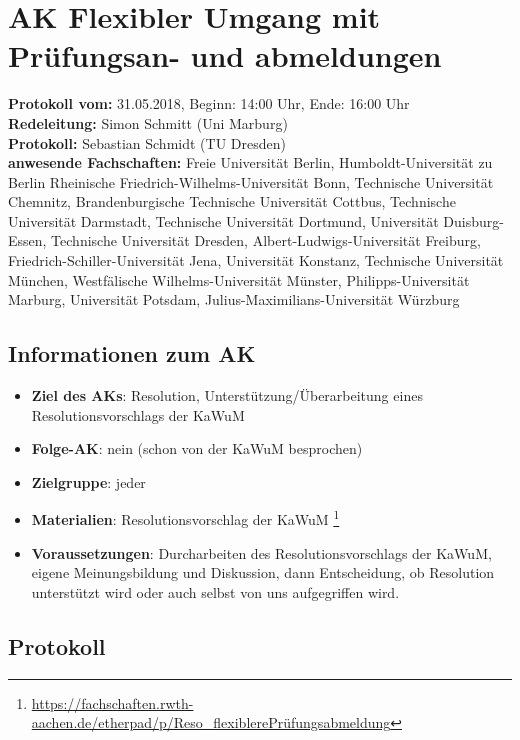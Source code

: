 
\section{AK Flexibler Umgang mit Prüfungsan- und abmeldungen}

  \textbf{Protokoll vom:} 31.05.2018,
  Beginn: 14:00 Uhr,
  Ende: 16:00 Uhr \\
  \textbf{Redeleitung:} Simon Schmitt (Uni Marburg) \\
  \textbf{Protokoll:} Sebastian Schmidt (TU Dresden) \\
  \textbf{anwesende Fachschaften:} Freie Universität Berlin, Humboldt-Universität zu Berlin Rheinische Friedrich-Wilhelms-Universität Bonn, Technische Universität Chemnitz, Brandenburgische Technische Universität Cottbus, Technische Universität Darmstadt, Technische Universität Dortmund, Universität Duisburg-Essen, Technische Universität Dresden, Albert-Ludwigs-Universität Freiburg, Friedrich-Schiller-Universität Jena, Universität Konstanz, Technische Universität München, Westfälische Wilhelms-Universität Münster, Philipps-Universität Marburg, Universität Potsdam, Julius-Maximilians-Universität Würzburg

  \subsection*{Informationen zum AK}
    \begin{itemize}
      \item \textbf{Ziel des AKs}: Resolution, Unterstützung/Überarbeitung eines Resolutionsvorschlags der KaWuM
      \item \textbf{Folge-AK}: nein (schon von der KaWuM besprochen)
      \item \textbf{Zielgruppe}: jeder
      \item \textbf{Materialien}: Resolutionsvorschlag der KaWuM \footnote{\url{https://fachschaften.rwth-aachen.de/etherpad/p/Reso_flexiblerePrüfungsabmeldung}}
      \item \textbf{Voraussetzungen}: Durcharbeiten des Resolutionsvorschlags der KaWuM, eigene Meinungsbildung und Diskussion, dann Entscheidung, ob Resolution unterstützt wird oder auch selbst von uns aufgegriffen wird.
    \end{itemize}

  \subsection*{Protokoll}
